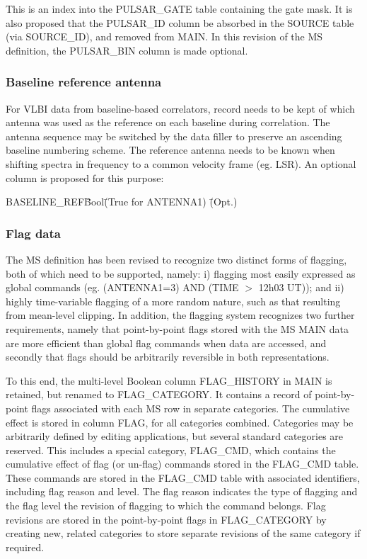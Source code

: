 \documentclass{article}
\begin{document}
This is an index into the PULSAR\_GATE table containing the gate mask.
It is also proposed that the PULSAR\_ID column be absorbed in the
SOURCE table (via SOURCE\_ID), and removed from MAIN.  In this
revision of the MS definition, the PULSAR\_BIN column is made
optional.

\subsubsection{Baseline reference antenna}

For VLBI data from baseline-based correlators, record needs to be kept
of which antenna was used as the reference on each baseline during
correlation. The antenna sequence may be switched by the data filler
to preserve an ascending baseline numbering scheme. The reference
antenna needs to be known when shifting spectra in frequency to a
common velocity frame (eg. LSR). An optional column is proposed for
this purpose:

\begin{tabbing}
BASELINE\_REF\quad\quad \= Bool\quad\quad \= (True for ANTENNA1)
 \quad\quad \= (Opt.) \\
\end{tabbing}

\subsubsection{Flag data}

 The MS definition has been revised to recognize two distinct forms of
flagging, both of which need to be supported, namely: i) flagging most
easily expressed as global commands (eg. (ANTENNA1=3) AND (TIME $>$
12h03 UT)); and ii) highly time-variable flagging of a more random
nature, such as that resulting from mean-level clipping. In addition,
the flagging system recognizes two further requirements, namely that
point-by-point flags stored with the MS MAIN data are more efficient
than global flag commands when data are accessed, and secondly that
flags should be arbitrarily reversible in both representations.

 To this end, the multi-level Boolean column FLAG\_HISTORY in MAIN is
retained, but renamed to FLAG\_CATEGORY. It contains a record of
point-by-point flags associated with each MS row in separate
categories. The cumulative effect is stored in column FLAG, for all
categories combined. Categories may be arbitrarily defined by editing
applications, but several standard categories are reserved. This
includes a special category, FLAG\_CMD, which contains the cumulative
effect of flag (or un-flag) commands stored in the FLAG\_CMD
table. These commands are stored in the FLAG\_CMD table with
associated identifiers, including flag reason and level. The flag
reason indicates the type of flagging and the flag level the revision
of flagging to which the command belongs. Flag revisions are stored in
the point-by-point flags in FLAG\_CATEGORY by creating new, related
categories to store separate revisions of the same category if
required.
\end{document}

